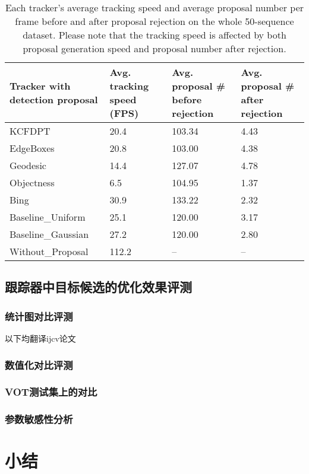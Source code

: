 \begin{table*}
	\centering
	\begin{tabular}{| p{1.3in} | p{0.9in}<{\centering} | p{0.9in}<{\centering} | p{0.9in}<{\centering} |}
		\hline
		Tracker with detection proposal & Avg. tracking speed (FPS) & Avg. proposal \# before rejection & Avg. proposal \# after rejection \\
		\hline
		KCFDPT & 20.4 & 103.34  & 4.43 \\
		\hline
		EdgeBoxes & 20.8  & 103.00  & 4.38 \\
		\hline
		Geodesic & 14.4 & 127.07  & 4.78 \\
		\hline
		Objectness & 6.5  & 104.95  & 1.37 \\
		\hline
		Bing & 30.9  & 133.22 & 2.32 \\
		\hline
		Baseline\_Uniform & 25.1  & 120.00  & 3.17 \\
		\hline
		Baseline\_Gaussian & 27.2  & 120.00  & 2.80 \\
		\hline
		Without\_Proposal & 112.2  & --  & -- \\
		\hline
	\end{tabular}
	\caption{Each tracker's average tracking speed and average proposal number per frame before and after proposal rejection on the whole 50-sequence dataset. Please note that the tracking speed is affected by both proposal generation speed and proposal number after rejection.}
	\label{dpstat}
\end{table*}

\subsection{跟踪器中目标候选的优化效果评测}
\subsubsection{统计图对比评测}
以下均翻译ijcv论文
\subsubsection{数值化对比评测}
\subsubsection{VOT测试集上的对比}
\subsubsection{参数敏感性分析}
\label{parameter-sensitivity}

\section{小结}